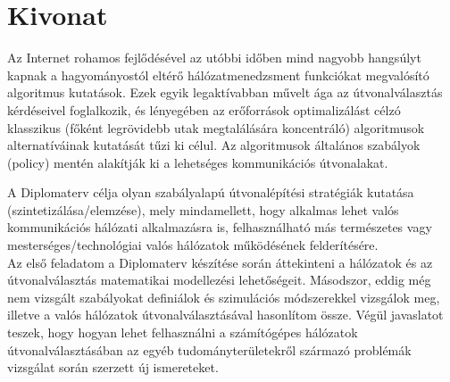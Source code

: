 \chapter*{Kivonat}

Az Internet rohamos fejlődésével az utóbbi időben mind nagyobb hangsúlyt kapnak a hagyományostól eltérő hálózatmenedzsment funkciókat megvalósító algoritmus kutatások. Ezek egyik legaktívabban művelt ága az útvonalválasztás kérdéseivel foglalkozik, és lényegében az erőforrások optimalizálást célzó klasszikus (főként legrövidebb utak megtalálására koncentráló) algoritmusok alternatíváinak kutatását tűzi ki célul. Az algoritmusok általános szabályok (policy) mentén alakítják ki a lehetséges kommunikációs útvonalakat.

A Diplomaterv célja olyan szabályalapú útvonalépítési stratégiák kutatása (szintetizálása/elemzése), mely mindamellett, hogy alkalmas lehet valós kommunikációs hálózati alkalmazásra is, felhasználható más természetes vagy mesterséges/technológiai valós hálózatok működésének felderítésére.\\

Az első feladatom a Diplomaterv készítése során áttekinteni a hálózatok és az útvonalválasztás matematikai modellezési lehetőségeit. Másodszor, eddig még nem vizsgált szabályokat definiálok és szimulációs módszerekkel vizsgálok meg, illetve a valós hálózatok útvonalválasztásával hasonlítom össze. Végül javaslatot teszek, hogy hogyan lehet felhasználni a számítógépes hálózatok útvonalválasztásában az egyéb tudományterületekről származó problémák vizsgálat során szerzett új ismereteket.

\vfill


\iffalse


\chapter*{Abstract}\addcontentsline{toc}{chapter}{Abstract}

This document is a \LaTeX-based skeleton for BSc/MSc~theses of students at the Electrical Engineering and Informatics Faculty, Budapest University of Technology and Economics. The usage of this skeleton is optional. It has been tested with the \emph{TeXLive} \TeX~implementation, and it requires the PDF-\LaTeX~compiler.
\vfill

\fi
